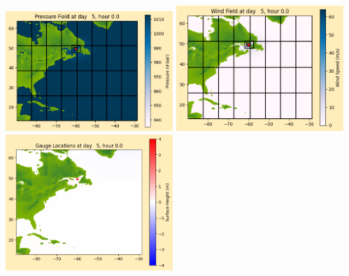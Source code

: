 \documentclass[11pt]{article}
\begin{document}
\includegraphics[width=0.475\textwidth]{frame0032fig1012.png}
\vskip 10pt 
\includegraphics[width=0.475\textwidth]{frame0032fig1013.png}
\includegraphics[width=0.475\textwidth]{frame0032fig1014.png}
\end{document}
